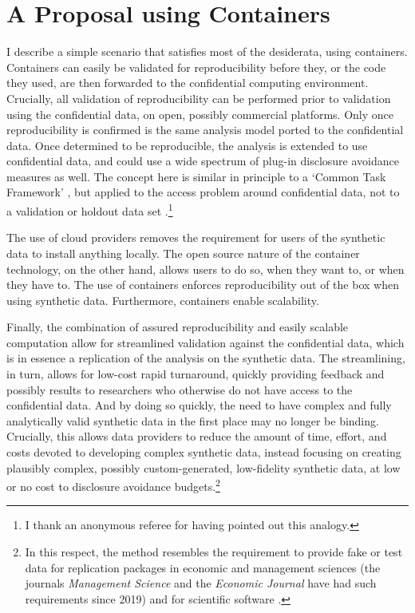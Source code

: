 \documentclass[inline]{hdsr}
\begin{document}
\section{A Proposal using Containers}
\label{sec:proposal}
I describe a simple scenario that satisfies most of the desiderata,  using containers.  Containers can easily be validated for reproducibility before they, or the code they used, are then forwarded to the confidential computing environment. Crucially, all validation of reproducibility can be performed prior to validation using the confidential data, on open, possibly commercial platforms. Only once reproducibility is confirmed is the same analysis model ported to the confidential data. Once determined to be reproducible, the analysis is extended to use confidential data, and could use a wide spectrum of plug-in disclosure avoidance measures as well. The concept here is similar in principle to a `Common Task Framework' \citep{liberman_obituary_2010,liberman_reproducible_2014,liu_successes_2019}, but applied to the access problem around confidential data, not to a validation or holdout data set \citep{liu_successes_2019,donoho_data_2024}.\footnote{I thank an anonymous referee for having pointed out this analogy.}  

The use of cloud providers removes the requirement for users of the synthetic data to install anything locally. The open source nature of the container technology, on the other hand, allows users to do so, when they want to, or when they have to. The use of containers enforces reproducibility out of the box when using synthetic data. Furthermore, containers enable scalability. 

Finally, the combination of assured reproducibility and easily scalable computation allow for streamlined validation against the confidential data, which is in essence a replication of the analysis on the synthetic data. The streamlining, in turn, allows for low-cost rapid turnaround, quickly providing feedback and possibly results to researchers who otherwise do not have access to the confidential data. And by doing so quickly, the need to have complex and fully analytically valid synthetic data in the first place may no longer be binding. Crucially, this allows data providers to reduce the amount of time, effort, and costs devoted to developing complex synthetic data, instead focusing on creating plausibly complex, possibly custom-generated, low-fidelity synthetic data, at low or no cost to disclosure avoidance budgets.\footnote{In this respect, the method resembles the requirement to provide fake or test data for replication packages in economic and management sciences (the journals \textit{Management Science} and the \textit{Economic Journal} have had such requirements since 2019) and for scientific software \citep{krafczykScientificTestsContinuous2019}.}
\end{document}
